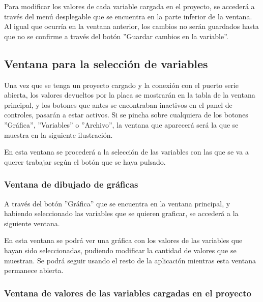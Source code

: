 Para modificar los valores de cada variable cargada en el proyecto, se accederá a través del menú desplegable que se encuentra en la parte inferior de la ventana. Al igual que ocurría en la ventana anterior, los cambios no serán guardados hasta que  no se confirme a través del botón ''Guardar cambios en la variable''.


\subsection{Ventana para la selección de variables}

Una vez que se tenga un proyecto cargado y la conexión con el puerto serie abierta, los valores devueltos por la placa se mostrarán en la tabla de la ventana principal, y los botones que antes se encontraban inactivos en el panel de controles, pasarán a estar activos. Si se pincha sobre cualquiera de los botones ''Gráfica'', ''Variables'' o ''Archivo'', la ventana que aparecerá será la que se muestra en la siguiente ilustración.


En esta ventana se procederá a la selección de las variables con las que se va a querer trabajar según el botón que se haya pulsado. 

\subsubsection{Ventana de dibujado de gráficas}

A través del botón ''Gráfica'' que se encuentra en la ventana principal, y habiendo seleccionado las variables que se quieren graficar, se accederá a la siguiente ventana.


En esta ventana se podrá ver una gráfica con los valores de las variables que hayan sido seleccionadas, pudiendo modificar la cantidad de valores que se muestran. Se podrá seguir usando el resto de la aplicación mientras esta ventana permanece abierta.

\subsubsection{Ventana de valores de las variables cargadas en el proyecto}

